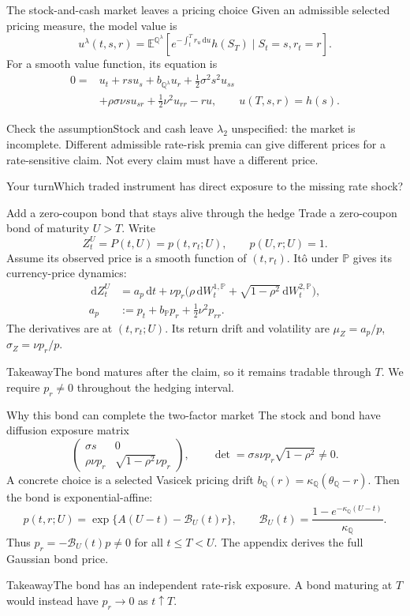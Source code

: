 \documentclass[handout,10pt,t,aspectratio=169]{beamer}
\newenvironment{pausebox}{\begin{block}{Your turn}}{\end{block}}
\newenvironment{keybox}{\begin{exampleblock}{Takeaway}}{\end{exampleblock}}
\newenvironment{watchbox}{\begin{alertblock}{Check the assumption}}{\end{alertblock}}
\newcommand{\E}{\mathbb E}
\newcommand{\Q}{\mathbb Q}
\newcommand{\Pp}{\mathbb P}
\newcommand{\dd}{\,\mathrm d}
\begin{document}
\begin{frame}{The stock-and-cash market leaves a pricing choice}
\small
Given an admissible selected pricing measure, the model value is
\[
 \boxed{u^\lambda(t,s,r)=\E^{\Q^\lambda}\!\left[
 e^{-\int_t^T r_u\dd u}h(S_T)\mid S_t=s,r_t=r\right].}
\]
For a smooth value function, its equation is
\[
 \begin{aligned}
 0={}&u_t+rsu_s+b_{\Q^\lambda}u_r+\tfrac12\sigma^2s^2u_{ss}\\
 &+\rho\sigma\nu s u_{sr}+\tfrac12\nu^2u_{rr}-ru,
 \qquad u(T,s,r)=h(s).
 \end{aligned}
\]
\begin{watchbox}Stock and cash leave \(\lambda_2\) unspecified:
the market is incomplete. Different admissible rate-risk premia can give
different prices for a rate-sensitive claim. Not every claim must have a different price.
\end{watchbox}
\begin{pausebox}Which traded instrument has direct exposure to the missing rate shock?\end{pausebox}
\end{frame}

\begin{frame}{Add a zero-coupon bond that stays alive through the hedge}
\small
Trade a zero-coupon bond of maturity \(U>T\). Write
\[
 Z_t^U=P(t,U)=p(t,r_t;U),\qquad p(U,r;U)=1.
\]
Assume its observed price is a smooth function of \((t,r_t)\).
It\^o under \(\Pp\) gives its currency-price dynamics:
\[
 \begin{aligned}
 \dd Z_t^U&=a_p\dd t+\nu p_r
 \bigl(\rho\dd W_t^{1,\Pp}+\sqrt{1-\rho^2}\dd W_t^{2,\Pp}\bigr),\\
 a_p&:=p_t+b_\Pp p_r+\tfrac12\nu^2p_{rr}.
 \end{aligned}
\]
The derivatives are at \((t,r_t;U)\). Its return drift and volatility are
\(\mu_Z=a_p/p\), \(\sigma_Z=\nu p_r/p\).
\begin{keybox}The bond matures after the claim, so it remains tradable
through \(T\). We require \(p_r\ne0\) throughout the hedging interval.
\end{keybox}
\end{frame}

\begin{frame}{Why this bond can complete the two-factor market}
\small
The stock and bond have diffusion exposure matrix
\[
 \begin{pmatrix}
 \sigma s&0\\
 \rho\nu p_r&\sqrt{1-\rho^2}\nu p_r
 \end{pmatrix},\qquad
 \det=\sigma s\nu p_r\sqrt{1-\rho^2}\ne0.
\]
A concrete choice is a selected Vasicek pricing drift
\(b_\Q(r)=\kappa_\Q(\theta_\Q-r)\). Then the bond is exponential-affine:
\[
 p(t,r;U)=\exp\{A(U-t)-\mathcal B_U(t)r\},\qquad
 \mathcal B_U(t)=\frac{1-e^{-\kappa_\Q(U-t)}}{\kappa_\Q}.
\]
Thus \(p_r=-\mathcal B_U(t)p\ne0\) for all \(t\leq T<U\).
The appendix derives the full Gaussian bond price.
\begin{keybox}The bond has an independent rate-risk exposure.
A bond maturing at \(T\) would instead have \(p_r\to0\) as \(t\uparrow T\).
\end{keybox}
\end{frame}
\end{document}
